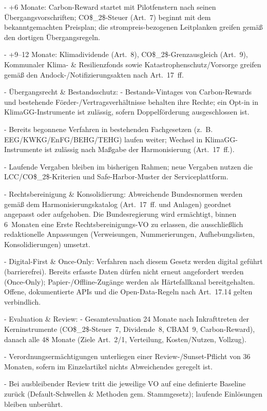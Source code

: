 \documentclass[12pt,a4paper]{scrartcl}
\begin{document}
- +6 Monate: Carbon-Reward startet mit Pilotfenstern nach seinen Übergangsvorschriften; CO\$\_2\$-Steuer (Art. 7) beginnt mit dem bekanntgemachten Preisplan; die strompreis-bezogenen Leitplanken greifen gemäß den dortigen Übergangsregeln.

- +9--12 Monate: Klimadividende (Art. 8), CO\$\_2\$-Grenzausgleich (Art. 9), Kommunaler Klima- \& Resilienzfonds sowie Katastrophenschutz/Vorsorge greifen gemäß den Andock-/Notifizierungsakten nach Art. 17 ff.

- Übergangsrecht \& Bestandsschutz:
- Bestands-Vintages von Carbon-Rewards und bestehende Förder-/Vertragsverhältnisse behalten ihre Rechte; ein Opt-in in KlimaGG-Instrumente ist zulässig, sofern Doppelförderung ausgeschlossen ist.

- Bereits begonnene Verfahren in bestehenden Fachgesetzen (z. B. EEG/KWKG/EnFG/BEHG/TEHG) laufen weiter; Wechsel in KlimaGG-Instrumente ist zulässig nach Maßgabe der Harmonisierung (Art. 17 ff.).

- Laufende Vergaben bleiben im bisherigen Rahmen; neue Vergaben nutzen die LCC/CO\$\_2\$-Kriterien und Safe-Harbor-Muster der Serviceplattform.

- Rechtsbereinigung \& Konsolidierung: Abweichende Bundesnormen werden gemäß dem Harmonisierungskatalog (Art. 17 ff. und Anlagen) geordnet angepasst oder aufgehoben. Die Bundesregierung wird ermächtigt, binnen 6 Monaten eine Erste Rechtsbereinigungs-VO zu erlassen, die ausschließlich redaktionelle Anpassungen (Verweisungen, Nummerierungen, Aufhebungslisten, Konsolidierungen) umsetzt.

- Digital-First \& Once-Only: Verfahren nach diesem Gesetz werden digital geführt (barrierefrei). Bereits erfasste Daten dürfen nicht erneut angefordert werden (Once-Only); Papier-/Offline-Zugänge werden als Härtefallkanal bereitgehalten. Offene, dokumentierte APIs und die Open-Data-Regeln nach Art. 17.14 gelten verbindlich.

- Evaluation \& Review:
- Gesamtevaluation 24 Monate nach Inkrafttreten der Kerninstrumente (CO\$\_2\$-Steuer 7, Dividende 8, CBAM 9, Carbon-Reward), danach alle 48 Monate (Ziele Art. 2/1, Verteilung, Kosten/Nutzen, Vollzug).

- Verordnungsermächtigungen unterliegen einer Review-/Sunset-Pflicht von 36 Monaten, sofern im Einzelartikel nichts Abweichendes geregelt ist.

- Bei ausbleibender Review tritt die jeweilige VO auf eine definierte Baseline zurück (Default-Schwellen \& Methoden gem. Stammgesetz); laufende Einlösungen bleiben unberührt.
\end{document}
